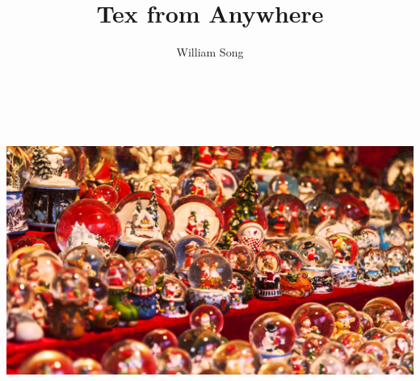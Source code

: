 \documentclass{article}
\author{William Song}
\title{Tex from Anywhere}
\begin{document}
	\begin{center}
	\includegraphics[width=7.00in,height=4.00in]{1,eps.jpg}
	\end{center}
\end{document}
